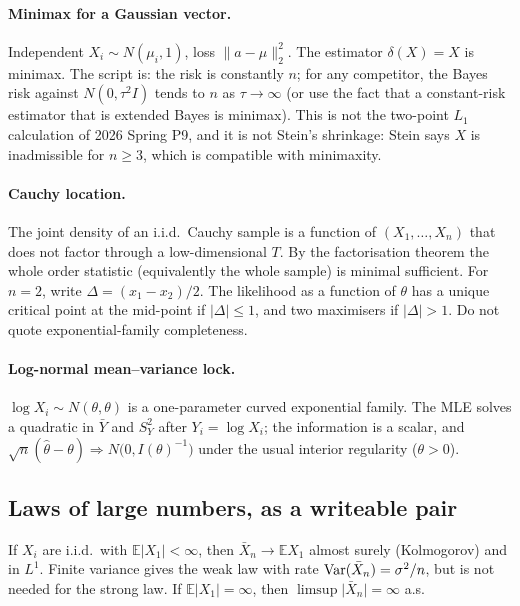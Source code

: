 \paragraph{Minimax for a Gaussian vector.}
 Independent \(X_{i}\sim N(\mu_{i},1)\), loss \(\|a-\mu\|_{2}^{2}\). The estimator \(\delta(X)=X\) is minimax. The script is: the risk is constantly \(n\); for any competitor, the Bayes risk against \(N(0,\tau^{2}I)\) tends to \(n\) as \(\tau\to\infty\) (or use the fact that a constant-risk estimator that is extended Bayes is minimax). This is not the two-point \(L_{1}\) calculation of 2026 Spring P9, and it is not Stein's shrinkage: Stein says \(X\) is inadmissible for \(n\ge 3\), which is compatible with minimaxity.

\paragraph{Cauchy location.}
 The joint density of an i.i.d.\ Cauchy sample is a function of \((X_{1},\ldots,X_{n})\) that does not factor through a low-dimensional \(T\). By the factorisation theorem the whole order statistic (equivalently the whole sample) is minimal sufficient. For \(n=2\), write \(\Delta=(x_{1}-x_{2})/2\). The likelihood as a function of \(\theta\) has a unique critical point at the mid-point if \(\lvert\Delta\rvert\le 1\), and two maximisers if \(\lvert\Delta\rvert>1\). Do not quote exponential-family completeness.

\paragraph{Log-normal mean--variance lock.}
 \(\log X_{i}\sim N(\theta,\theta)\) is a one-parameter curved exponential family. The MLE solves a quadratic in \(\bar Y\) and \(S_{Y}^{2}\) after \(Y_{i}=\log X_{i}\); the information is a scalar, and \(\sqrt{n}(\hat\theta-\theta)\Rightarrow N\bigl(0,I(\theta)^{-1}\bigr)\) under the usual interior regularity (\(\theta>0\)).

\subsection{Laws of large numbers, as a writeable pair}

\begin{theorem}
\label{thm:lln}
If \(X_{i}\) are i.i.d.\ with \(\mathbb{E}\lvert X_{1}\rvert<\infty\), then \(\bar X_{n}\to\mathbb{E}X_{1}\) almost surely (Kolmogorov) and in \(L^{1}\). Finite variance gives the weak law with rate \(\operatorname{Var}(\bar X_{n})=\sigma^{2}/n\), but is not needed for the strong law. If \(\mathbb{E}\lvert X_{1}\rvert=\infty\), then \(\limsup\lvert\bar X_{n}\rvert=\infty\) a.s.
\end{theorem}

